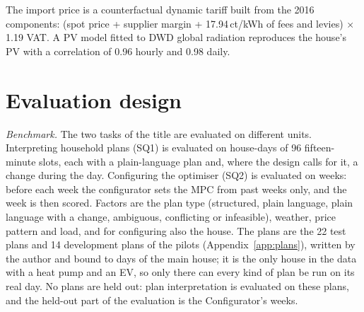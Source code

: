 The import price is a counterfactual dynamic tariff built from the 2016
components: (spot price + supplier margin + 17.94\,ct/kWh of fees and
levies) $\times$ 1.19 VAT. A PV model fitted to DWD global radiation
reproduces the house's PV with a correlation of 0.96 hourly and 0.98
daily.

\section{Evaluation design}
\label{sec:evaldesign}

\textit{Benchmark.} The two tasks of the title are evaluated on
different units. Interpreting household plans (SQ1) is evaluated on
house-days of 96 fifteen-minute slots, each with a plain-language plan
and, where the design calls for it, a change during the day.
Configuring the optimiser (SQ2) is evaluated on weeks: before each week
the configurator sets the MPC from past weeks only, and the week is then
scored. Factors are the plan type (structured, plain language,
plain language with a change, ambiguous, conflicting or infeasible),
weather, price pattern and load, and for configuring also the house.
The plans are the 22 test plans and 14 development plans of the pilots
(Appendix~\ref{app:plans}), written by the author and bound to days of
the main house; it is the only house in the data with a heat pump and
an EV, so only there can every kind of plan be run on its real day. No
plans are held out: plan interpretation is evaluated on these plans,
and the held-out part of the evaluation is the Configurator's weeks.

